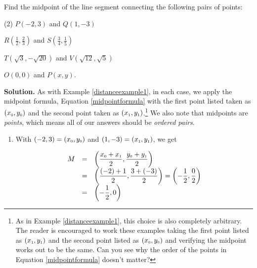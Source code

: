 \begin{ex} 

Find the midpoint of the line segment connecting the following pairs of points:  


\begin{tasks}(2)
\task $P(-2,3)$ and  $Q(1,-3)$ 

\task $R\left( \frac{1}{2}, \frac{2}{3}\right)$ and $S\left( \frac{3}{4}, \frac{1}{5}\right)$ 

\task*  $T(\sqrt{3}, -\sqrt{20})$ and $V(\sqrt{12}, \sqrt{5})$

\task   $O(0,0)$ and $P(x,y)$. 

\end{tasks}

\medskip

{\bf Solution.}  As with Example \ref{distanceexample1}, in each case, we apply the midpoint formula, Equation \ref{midpointformula} with the first point listed taken as  $\left(x_{\mbox{\tiny$0$}}, y_{\mbox{\tiny$0$}}\right)$ and the second point taken as $\left(x_{\mbox{\tiny$1$}}, y_{\mbox{\tiny$1$}}\right)$.\footnote{As in Example \ref{distanceexample1}, this choice is also completely arbitrary.  The reader is encouraged to work these examples taking the first point listed as $\left(x_{\mbox{\tiny$1$}}, y_{\mbox{\tiny$1$}}\right)$ and the second point listed as $\left(x_{\mbox{\tiny$0$}}, y_{\mbox{\tiny$0$}}\right)$ and verifying the midpoint works out to be the same.  Can you see why the order of the points in Equation \ref{midpointformula} doesn't matter?}  We also note that midpoints are \textit{points}, which means all of our answers should be \textit{ordered pairs}.

\begin{enumerate}

\item  With $(-2,3) =  \left(x_{\mbox{\tiny$0$}}, y_{\mbox{\tiny$0$}}\right)$ and  $(1,-3) = \left(x_{\mbox{\tiny$1$}}, y_{\mbox{\tiny$1$}}\right)$, we get

\setlength{\extrarowheight}{10pt}

\[ \begin{array}{rcl}
 M & = & \left( \dfrac{x_{\mbox{\tiny$0$}}+x_{\mbox{\tiny$1$}}}{2},  \dfrac{y_{\mbox{\tiny$0$}}+y_{\mbox{\tiny$1$}}}{2} \right) \\
   & = & \left( \dfrac{(-2)+1}{2},  \dfrac{3+(-3)}{2} \right)  = \left(- \dfrac{1}{2}, \dfrac{0}{2} \right) \\
   & = & \left(- \dfrac{1}{2}, 0 \right) 
   \end{array} \]
   

\end{enumerate}
\end{ex}
